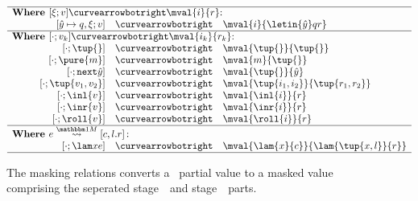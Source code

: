 
\begin{figure}
\begin{abstrsyn}
\[\begin{array}{rrrl}
\hline
\multicolumn{4}{l}  {\text{\bf Where } [\xi;v] \vsplito \mval {i} {r} \text{:}}          \\
\hspace{0.25in} 
&[\hat y \mapsto q,\xi;v]  &\vsplito& \mval  {i}             {\letin {\hat y} q {r}}      \\
\hline
\multicolumn{4}{l}  {\text{\bf Where } [\cdot;v_k] \vsplito \mval {i_k} {r_k} \text{:}}  \\
&[\cdot;\tup{}]            &\vsplito& \mval  {\tup{}}        {\tup{}}                     \\
&[\cdot;\pure{m}]          &\vsplito& \mval  {m}             {\tup{}}                     \\
&[\cdot;\next{\hat y}]     &\vsplito& \mval  {\tup{}}            {\hat y}                     \\
&[\cdot;\tup{v_1,v_2}]         &\vsplito& \mval  {\tup{i_1,i_2}}     {\tup{r_1,r_2}}                  \\
&[\cdot;\inl{v}]           &\vsplito& \mval  {\inl{i}}       {r}                          \\
&[\cdot;\inr{v}]           &\vsplito& \mval  {\inr{i}}       {r}                          \\
&[\cdot;\roll{v}]          &\vsplito& \mval  {\roll{i}}      {r}                          \\
\hline
\multicolumn{4}{l}  {\text{\bf Where } \splitone e A {c,l.r} \text{:}}                   \\
&[\cdot;\lam xe]           &\vsplito& \mval  {\lam {x} {c}}  {\lam {\tup{x,l}} {r}}			\\
\hline
\end{array}\]
\end{abstrsyn}
\caption{The masking relations converts a \lang\ partial value to a masked value
comprising the seperated stage~\bbone\ and stage~\bbtwo\ parts.}
\label{fig:valMask}
\end{figure}
